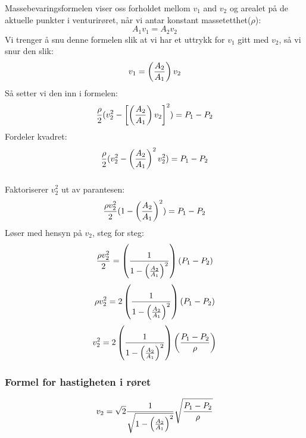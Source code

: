\documentclass{beamer}
\begin{document}
\begin{frame}
	\frametitle{}

	



Massebevaringsformelen viser oss forholdet mellom $v_1$ and $v_2$ og arealet på de aktuelle punkter i venturirøret, når vi antar konstant massetetthet($\rho$):
%
$$A_1 v_1 = A_2 v_2$$
%
Vi trenger å snu denne formelen slik at vi har et uttrykk for $v_1$ gitt med $v_2$, så vi snur den slik:
%
$$v_1 = \left({A_2 \over A_1}\right) v_2$$
%
Så setter vi den inn i formelen:       
%
$${\rho \over 2} (v_2^2 - \left[\left({A_2 \over A_1}\right) v_2\right]^2) = P_1 - P_2$$
%
Fordeler kvadret:
%
$${\rho \over 2} (v_2^2 - \left({A_2 \over A_1}\right)^2 v_2^2) = P_1 - P_2$$
%
\end{frame}
\begin{frame}
	\frametitle{}

	


%
%
Faktoriserer $v_2^2$ ut av parantesen:
$${\rho v_2^2 \over 2} (1 - \left({A_2 \over A_1}\right)^2) = P_1 - P_2$$
%
Løser med hensyn på $v_2$, steg for steg:
%
$${\rho v_2^2 \over 2} = \left({1 \over {1 - \left({A_2 \over A_1}\right)^2}}\right) (P_1 - P_2)$$
%
$$\rho v_2^2 = 2 \left({1 \over {1 - \left({A_2 \over A_1}\right)^2}}\right) (P_1 - P_2)$$
%
$$v_2^2 = 2 \left({1 \over {1 - \left({A_2 \over A_1}\right)^2}}\right) \left({{P_1 - P_2} \over \rho}\right)$$
%
\end{frame}
\begin{frame}
	\frametitle{Formel for hastigheten i røret}

	



$$v_2 = \sqrt{2} {1 \over \sqrt{1 - \left({A_2 \over A_1}\right)^2}} \sqrt{{P_1 - P_2} \over \rho}$$
%
%
\end{frame}
\end{document}
